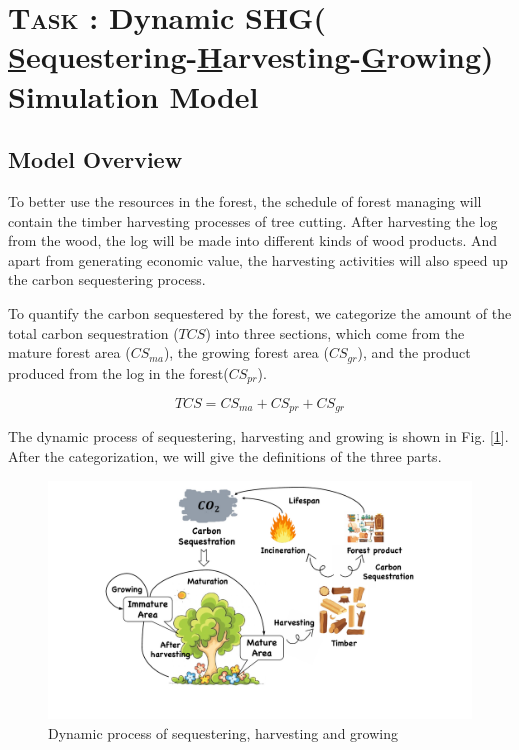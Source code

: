 \section{\textsc {Task \uppercase\expandafter{}}: Dynamic SHG( \underline{S}equestering-\underline{H}arvesting-\underline{G}rowing) Simulation Model}
\subsection{Model Overview}
To better use the resources in the forest, the schedule of forest managing will contain the timber harvesting processes of tree cutting. After harvesting the log from the wood, the log will be made into different kinds of wood products. And apart from generating economic value, the harvesting activities will also speed up the carbon sequestering process.

To quantify the carbon sequestered by the forest, we categorize the amount of the total carbon sequestration ($TCS$) into three sections, which come from the mature forest area ($CS_{ma}$), the growing forest area ($CS_{gr}$), and the product produced from the log in the forest($CS_{pr}$). 

\begin{equation}
   TCS = CS_{ma} + CS_{pr} + CS_{gr} \label{XX}
\end{equation}

The dynamic process of sequestering, harvesting and growing is shown in Fig. [\ref{Dynamic process of sequestering}]. After the categorization, we will give the definitions of the three parts.

\begin{figure}[H]
\centering
\includegraphics[scale = 0.4]{mcmthesis-demo/figures/Dynamic Process of Carbon Cycle .pdf}
\caption{Dynamic process of sequestering, harvesting and growing} 
\label{Dynamic process of sequestering}
\end{figure}

